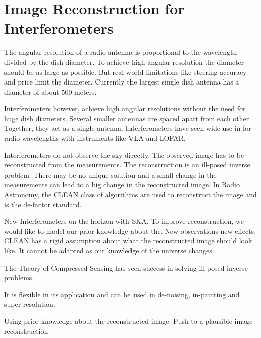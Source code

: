 \section{Image Reconstruction for Interferometers}\label{intro}
The angular resolution of a radio antenna is proportional to the wavelength divided by the dish diameter. To achieve high angular resolution the diameter should be as large as possible. But real world limitations like steering accuracy and price limit the diameter. Currently the largest single dish antenna has a diameter of about 500 meters\cite{chinaFAST}. 
  
Interferometers however, achieve high angular resolutions without the need for huge dish diameters. Several smaller antennas are spaced apart from each other. Together, they act as a single antenna. Interferometers have seen wide use in for radio wavelengths with instruments like VLA and LOFAR.


Interferometers do not observe the sky directly. The observed image has to be reconstructed from the measurements. The reconstruction is an ill-posed inverse problem: There may be no unique solution and a small change in the measurements can lead to a big change in the reconstructed image. In Radio Astronomy, the CLEAN class of algorithms\cite{hogbom1974aperture}\cite{schwab1984relaxing}\cite{rich2008multi}\cite{rau2011multi} are used to reconstruct the image and is the de-factor standard. 

New Interferometers on the horizon with SKA. To improve reconstruction, we would like to model our prior knowledge about the. New observations new effects. CLEAN has a rigid assumption about what the reconstructed image should look like. It cannot be adapted as our knowledge of the universe changes.

The Theory of Compressed Sensing\cite{candes2006robust}\cite{donoho2006compressed} has seen success in solving ill-posed inverse problems. 

It is flexible in its application and can be used in de-noising\cite{many}, in-painting\cite{many} and super-resolution\cite{many}.

Using prior knowledge about the reconstructed image. 
Push to a plausible image reconstruction


